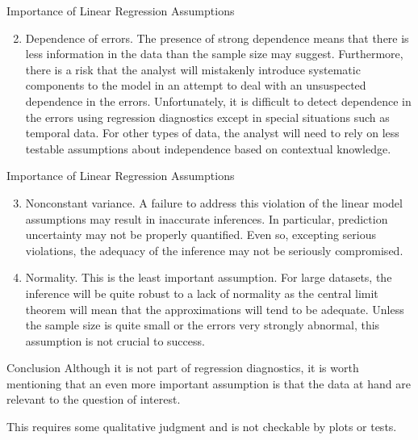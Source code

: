 \begin{frame}{Importance of Linear Regression Assumptions}
\protect\hypertarget{importance-of-linear-regression-assumptions-1}{}
\begin{enumerate}
\setcounter{enumi}{1}
\tightlist
\item
  Dependence of errors. The presence of strong dependence means that
  there is less information in the data than the sample size may
  suggest. Furthermore, there is a risk that the analyst will mistakenly
  introduce systematic components to the model in an attempt to deal
  with an unsuspected dependence in the errors. Unfortunately, it is
  difficult to detect dependence in the errors using regression
  diagnostics except in special situations such as temporal data. For
  other types of data, the analyst will need to rely on less testable
  assumptions about independence based on contextual knowledge.
\end{enumerate}
\end{frame}

\begin{frame}{Importance of Linear Regression Assumptions}
\protect\hypertarget{importance-of-linear-regression-assumptions-2}{}
\begin{enumerate}
\setcounter{enumi}{2}
\item
  Nonconstant variance. A failure to address this violation of the
  linear model assumptions may result in inaccurate inferences. In
  particular, prediction uncertainty may not be properly quantified.
  Even so, excepting serious violations, the adequacy of the inference
  may not be seriously compromised.
\item
  Normality. This is the least important assumption. For large datasets,
  the inference will be quite robust to a lack of normality as the
  central limit theorem will mean that the approximations will tend to
  be adequate. Unless the sample size is quite small or the errors very
  strongly abnormal, this assumption is not crucial to success.
\end{enumerate}
\end{frame}

\begin{frame}{Conclusion}
\protect\hypertarget{conclusion}{}
Although it is not part of regression diagnostics, it is worth
mentioning that an even more important assumption is that the data at
hand are relevant to the question of interest.

This requires some qualitative judgment and is not checkable by plots or
tests.
\end{frame}
